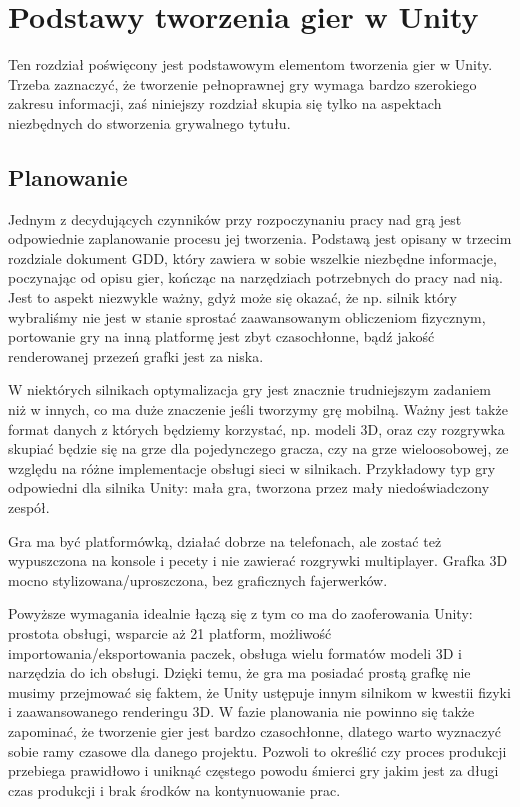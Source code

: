 \documentclass[openright]{xmgr}
\begin{document}
\chapter{Podstawy tworzenia gier w Unity}

Ten rozdział poświęcony jest podstawowym elementom tworzenia gier w Unity. Trzeba zaznaczyć, że tworzenie pełnoprawnej gry wymaga bardzo szerokiego zakresu informacji, zaś niniejszy rozdział skupia się tylko na aspektach niezbędnych do stworzenia grywalnego tytułu.

\section{Planowanie}

Jednym z decydujących czynników przy rozpoczynaniu pracy nad grą jest odpowiednie zaplanowanie procesu jej tworzenia. Podstawą jest opisany w trzecim rozdziale dokument GDD, który zawiera w sobie wszelkie niezbędne informacje, poczynając od opisu gier, kończąc na narzędziach potrzebnych do pracy nad nią. Jest to aspekt niezwykle ważny, gdyż może się okazać, że np. silnik który wybraliśmy nie jest w stanie sprostać zaawansowanym obliczeniom fizycznym, portowanie gry na inną platformę jest zbyt czasochłonne, bądź jakość renderowanej przezeń grafki jest za niska.

W niektórych silnikach optymalizacja gry jest znacznie trudniejszym zadaniem niż w innych, co ma duże znaczenie jeśli tworzymy grę mobilną. Ważny jest także format danych z których będziemy korzystać, np. modeli 3D, oraz czy rozgrywka skupiać będzie się na grze dla pojedynczego gracza, czy na grze wieloosobowej, ze względu na różne implementacje obsługi sieci w silnikach. Przykładowy typ gry odpowiedni dla silnika Unity: mała gra, tworzona przez mały niedoświadczony zespół.

Gra ma być platformówką, działać dobrze na telefonach, ale zostać też wypuszczona na konsole i pecety i nie zawierać rozgrywki multiplayer. Grafka 3D mocno stylizowana/uproszczona, bez graficznych fajerwerków.

Powyższe wymagania idealnie łączą się z tym co ma do zaoferowania Unity: prostota obsługi, wsparcie aż 21 platform, możliwość importowania/eksportowania paczek, obsługa wielu formatów modeli 3D i narzędzia do ich obsługi. Dzięki temu, że gra ma posiadać prostą grafkę nie musimy przejmować się faktem, że Unity ustępuje innym silnikom w kwestii fizyki i zaawansowanego renderingu 3D. W fazie planowania nie powinno się także zapominać, że tworzenie gier jest bardzo czasochłonne, dlatego warto wyznaczyć sobie ramy czasowe dla danego projektu. Pozwoli to określić czy proces produkcji przebiega prawidłowo i uniknąć częstego powodu śmierci gry jakim jest za długi czas produkcji i brak środków na kontynuowanie prac.
\end{document}
